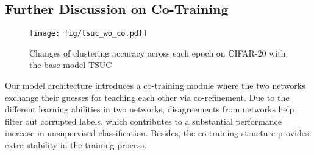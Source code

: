 \documentclass[final]{cvpr}
\begin{document}
\begin{table}[!h]
\centering
{}
\caption{Quality of the clean set regards to sampling strategies (C : Confidence, M : Metric, H : Hybrid)}
\label{tab:tsuc_strategy}
\end{table}



\subsection{Further Discussion on Co-Training}
\label{sup:co-training}
\begin{figure}[h!]
\centering
\captionsetup{width=.9\linewidth}
\texttt{[image: fig/tsuc\_wo\_co.pdf]}
    \caption{Changes of clustering accuracy across each epoch on CIFAR-20 with the base model TSUC}
    \label{fig:wo_co}
\end{figure}
Our model architecture introduces a co-training module where the two networks exchange their guesses for teaching each other via co-refinement. Due to the different learning abilities in two networks, disagreements from networks help filter out corrupted labels, which contributes to a substantial performance increase in unsupervised classification. Besides, the co-training structure provides extra stability in the training process.
\end{document}
